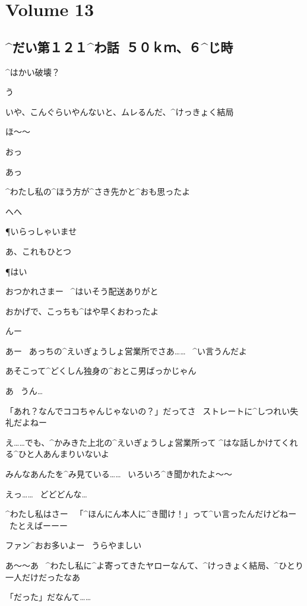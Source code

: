 \section{Volume 13}

\subsection{^{だい}{第}１２１^{わ}{話}\ ５０ｋｍ、６^{じ}{時}}

\page[5]
\M ^{はかい}{破壊}？

\A う

\A いや、こんぐらいやんないと、ムレるんだ、^{けっきょく}{結局}

\M ほ〜〜

\page[7]
\SH おっ

\K あっ

\SH ^{わたし}{私}の^{ほう}{方}が^{さき}{先}かと^{おも}{思}ったよ

\K へへ

\P いらっしゃいませ

\SH あ、これもひとつ

\P はい

\page
\K おつかれさまー
\ ^{はいそう}{配送}ありがと

\K おかげで、こっちも^{はや}{早}くおわったよ

\SH んー

\SH あー
\ あっちの^{えいぎょうしょ}{営業所}でさあ……
\ ^{い}{言}うんだよ

\SH あそこって^{どくしん}{独身}の^{おとこ}{男}ばっかじゃん

\K あ
\ うん…

\SH 「あれ？なんでココちゃんじゃないの？」だってさ
\ ストレートに^{しつれい}{失礼}だよねー

\page
\K え……でも、^{かみきた}{上北}の^{えいぎょうしょ}{営業所}って
^{はな}{話}しかけてくれる^{ひと}{人}あんまりいないよ

\SH みんなあんたを^{み}{見}ている……
\ いろいろ^{き}{聞}かれたよ〜〜

\K えっ……
\ どどどんな…

\SH ^{わたし}{私}はさー
\ 「^{ほんにん}{本人}に^{き}{聞}け！」って^{い}{言}ったんだけどねー
\ たとえばーーー

\page
\SH ファン^{おお}{多}いよー
\ うらやましい

\SH あ〜〜あ
\ ^{わたし}{私}に^{よ}{寄}ってきたヤローなんて、^{けっきょく}{結局}、^{ひとり}{一人}だけだったなあ

\K 「だった」だなんて……


